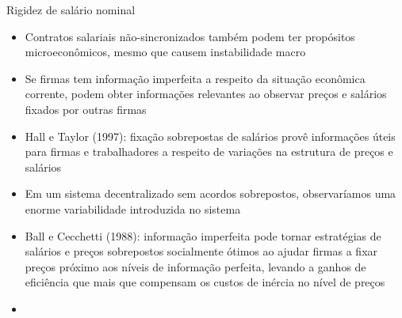 \documentclass[10pt]{beamer}
\begin{document}
\begin{frame}{Rigidez de salário nominal}
    \begin{itemize}
        \item Contratos salariais não-sincronizados também podem ter propósitos microeconômicos, mesmo que causem instabilidade macro\bigskip
        \item Se firmas tem informação imperfeita a respeito da situação econômica corrente, podem obter informações relevantes ao observar preços e salários fixados por outras firmas\bigskip
        \item Hall e Taylor (1997): fixação sobrepostas de salários provê informações úteis para firmas e trabalhadores a respeito de variações na estrutura de preços e salários\bigskip
        \item Em um sistema decentralizado sem acordos sobrepostos, observaríamos uma enorme variabilidade introduzida no sistema\bigskip
        \item Ball e Cecchetti (1988): informação imperfeita pode tornar estratégias de salários e preços sobrepostos socialmente ótimos ao ajudar firmas a fixar preços próximo aos níveis de informação perfeita, levando a ganhos de eficiência que mais que compensam os custos de inércia no nível de preços\bigskip
        \item {} 
    \end{itemize}
\end{frame}

\end{document}
